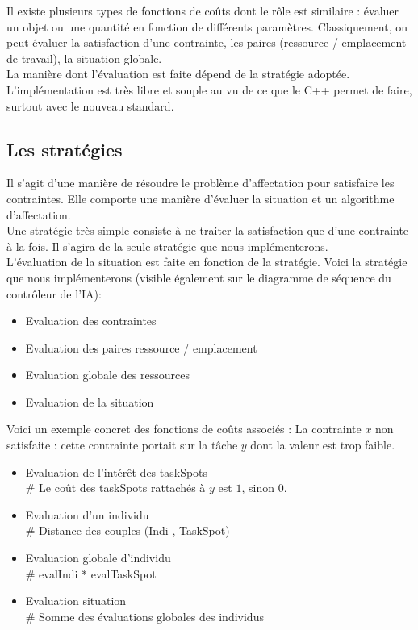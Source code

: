 Il existe plusieurs types de fonctions de coûts dont le rôle est similaire : évaluer un objet ou une quantité en fonction de différents paramètres. Classiquement, on peut évaluer la satisfaction d'une contrainte, les paires (ressource / emplacement de travail), la situation globale.\\
La manière dont l'évaluation est faite dépend de la stratégie adoptée.\\

L'implémentation est très libre et souple au vu de ce que le C++ permet de faire, surtout avec le nouveau standard.

\subsection{Les stratégies}

Il s'agit d'une manière de résoudre le problème d'affectation pour satisfaire les contraintes. Elle comporte une manière d'évaluer la situation et un algorithme d'affectation.\\

Une stratégie très simple consiste à ne traiter la satisfaction que d'une contrainte à la fois. Il s'agira de la seule stratégie que nous implémenterons.\\

L'évaluation de la situation est faite en fonction de la stratégie. Voici la stratégie que nous implémenterons (visible également sur le diagramme de séquence du contrôleur de l'IA):
\begin{itemize}
\item Evaluation des contraintes
\item Evaluation des paires ressource / emplacement
\item Evaluation globale des ressources
\item Evaluation de la situation \\
\end{itemize}

Voici un exemple concret des fonctions de coûts associés :
La contrainte $x$ non satisfaite : cette contrainte portait sur la tâche $y$ dont la valeur est trop faible.\\

\begin{itemize}
\item Evaluation de l'intérêt des taskSpots\\
\indent \# Le coût des taskSpots rattachés à $y$ est $1$, sinon $0$.
\item Evaluation d'un individu\\
\indent \# Distance des couples (Indi , TaskSpot)
\item Evaluation globale d'individu\\
\indent \# evalIndi * evalTaskSpot
\item Evaluation situation\\
\indent \# Somme des évaluations globales des individus\\
\end{itemize}

